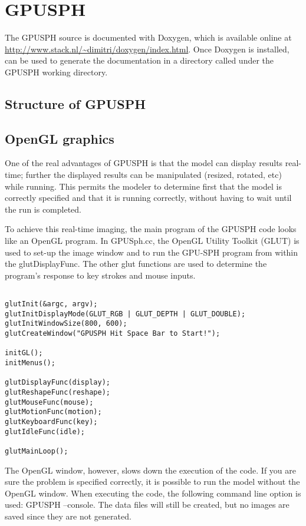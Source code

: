 \documentclass[12pt]{memoir}
\begin{document}

\chapter{GPUSPH}

The GPUSPH source is documented with Doxygen, which is available online
at \url{http://www.stack.nl/~dimitri/doxygen/index.html}. Once Doxygen
is installed,  can be used to generate the documentation
in a directory called  under the GPUSPH working directory.

\section{Structure of GPUSPH}


\iffalse

\section{OpenGL graphics}

One of the real advantages of GPUSPH is that the model can display
results real-time; further the displayed results can be manipulated
(resized, rotated, etc) while running. This permits the modeler to
determine first that the model is correctly specified and that it is
running correctly, without having to wait until the run is completed.

To achieve this real-time imaging, the main program of the GPUSPH code
looks like an OpenGL program. In GPUSph.cc, the OpenGL Utility Toolkit
(GLUT) is used to set-up the image window and to run the GPU-SPH program
from within the glutDisplayFunc. The other glut functions are used to
determine the program's response to key strokes and mouse inputs.

\begin{verbatim}

glutInit(&argc, argv);
glutInitDisplayMode(GLUT_RGB | GLUT_DEPTH | GLUT_DOUBLE);
glutInitWindowSize(800, 600);
glutCreateWindow("GPUSPH Hit Space Bar to Start!");

initGL();
initMenus();

glutDisplayFunc(display);
glutReshapeFunc(reshape);
glutMouseFunc(mouse);
glutMotionFunc(motion);
glutKeyboardFunc(key);
glutIdleFunc(idle);

glutMainLoop();
\end{verbatim}

The OpenGL window, however, slows down the execution of the code. If
you are sure the problem is specified correctly, it is possible to run
the model without the OpenGL window. When executing the code, the
following command line option is used: GPUSPH --console. The data
files will still be created, but no images are saved since they are not
generated.
\end{document}
